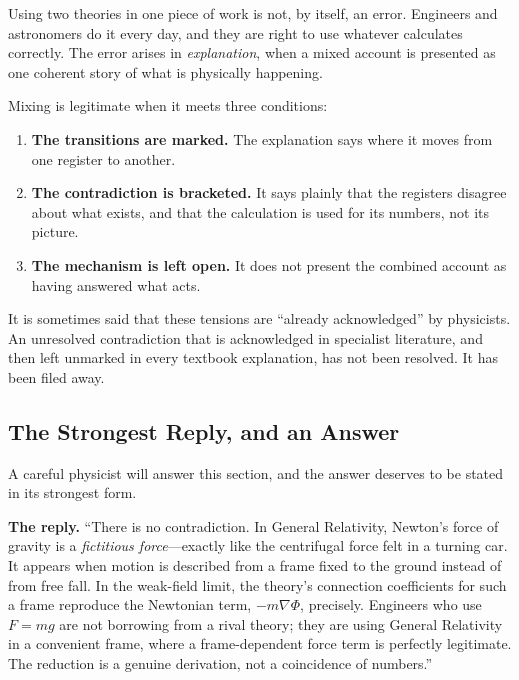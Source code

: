 \documentclass[11pt,a4paper]{article}
\begin{document}
Using two theories in one piece of work is not, by itself, an error. Engineers and astronomers do it every day, and they are right to use whatever calculates correctly. The error arises in \emph{explanation}, when a mixed account is presented as one coherent story of what is physically happening.

Mixing is legitimate when it meets three conditions:

\begin{enumerate}
  \item \textbf{The transitions are marked.} The explanation says where it moves from one register to another.
  \item \textbf{The contradiction is bracketed.} It says plainly that the registers disagree about what exists, and that the calculation is used for its numbers, not its picture.
  \item \textbf{The mechanism is left open.} It does not present the combined account as having answered what acts.
\end{enumerate}

It is sometimes said that these tensions are ``already acknowledged'' by physicists.  An unresolved contradiction that is acknowledged in specialist literature, and then left unmarked in every textbook explanation, has not been resolved. It has been filed away.

\subsection{The Strongest Reply, and an Answer}

A careful physicist will answer this section, and the answer deserves to be stated in its strongest form.

\begin{tcolorbox}[colback=black!3,colframe=black!25,boxrule=0.4pt,arc=2pt,left=8pt,right=8pt,top=6pt,bottom=6pt]
\textbf{The reply.} ``There is no contradiction. In General Relativity, Newton's force of gravity is a \emph{fictitious force}---exactly like the centrifugal force felt in a turning car. It appears when motion is described from a frame fixed to the ground instead of from free fall. In the weak-field limit, the theory's connection coefficients for such a frame reproduce the Newtonian term, $-m\nabla\Phi$, precisely. Engineers who use $F = mg$ are not borrowing from a rival theory; they are using General Relativity in a convenient frame, where a frame-dependent force term is perfectly legitimate. The reduction is a genuine derivation, not a coincidence of numbers.''
\end{tcolorbox}
\end{document}
